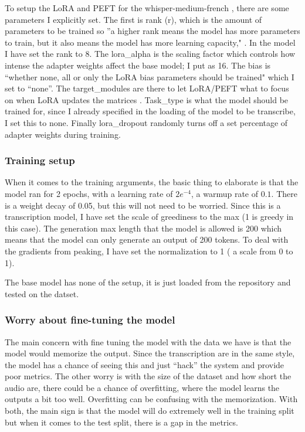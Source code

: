 \documentclass[12pt]{article}
\begin{document}
    To setup the LoRA and PEFT for the whisper-medium-french \citep{huang2022whisper-medium-french},
    there are some parameters I explicitly set. The first is rank (r), which is the
    amount of parameters to be trained so ''a higher rank means the model has more
    parameters to train, but it also means the model has more learning capacity,"
    \citep{hf-peft-lora-docs-v020}. In the model I have set the rank to $8$. The lora\_alpha
    is the scaling factor which controls how intense the adapter weights affect the
    base model; I put as 16. The bias is ``whether none, all or only the LoRA bias
    parameters should be trained" \citep{hf-peft-lora-docs-v020} which I set to ``none''.
    The target\_modules are there to let LoRA/PEFT what to focus on when LoRA
    updates the matrices \citep{hf_peft_lora_conceptual}. Task\_type is what the
    model should be trained for, since I already specified in the loading of the model
    to be transcribe, I set this to none. Finally lora\_dropout randomly turns off
    a set percentage of adapter weights during training.

    \subsubsection{Training setup}
    When it comes to the training arguments, the basic thing to elaborate is
    that the model ran for 2 epochs, with a learning rate of $2e^{-4}$, a warmup
    rate of $0.1$. There is a weight decay of 0.05, but this will not need to be
    worried. Since this is a transcription model, I have set the scale of
    greediness to the max (1 is greedy in this case). The generation max length that
    the model is allowed is 200 which means that the model can only generate an output
    of 200 tokens. To deal with the gradients from peaking, I have set the normalization
    to 1 ( a scale from 0 to 1).

    The base model has none of the setup, it is just loaded from the repository and
    tested on the datset.

    \subsubsection{Worry about fine-tuning the model}
    The main concern with fine tuning the model with the data we have is that the
    model would memorize the output. Since the transcription are in the same
    style, the model has a chance of seeing this and just ``hack'' the system and
    provide poor metrics. The other worry is with the size of the dataset and
    how short the audio are, there could be a chance of overfitting, where the
    model learns the outputs a bit too well. Overfitting can be confusing with the
    memorization. With both, the main sign is that the model will do extremely well
    in the training split but when it comes to the test split, there is a gap in
    the metrics.
\end{document}
